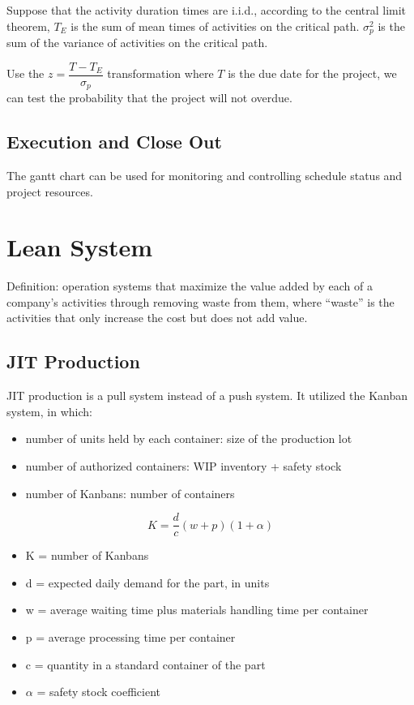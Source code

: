 \documentclass{article}
\begin{document}
Suppose that the activity duration times are i.i.d.,
according to the central limit theorem,
$T_E$ is the sum of mean times of activities on the critical path.
$\sigma_p^2$ is the sum of the variance of activities on the critical path.

Use the $z = \dfrac{T- T_E}{\sigma_p}$ transformation where $T$ is the due date for the project,
we can test the probability that the project will not overdue.

\subsection{Execution and Close Out}

The gantt chart can be used for monitoring and controlling schedule status and project resources.

\section{Lean System}

Definition: operation systems that maximize the value added by each of a company's activities through removing waste from them,
where ``waste'' is the activities that only increase the cost but does not add value.

\subsection{JIT Production}

JIT production is a pull system instead of a push system.
It utilized the Kanban system, in which:
\begin{itemize}
	\item number of units held by each container: size of the production lot
	\item number of authorized containers: WIP inventory + safety stock
	\item number of Kanbans: number of containers
\end{itemize}

\[
	K = \dfrac{d}{c}(w+p)(1+\alpha)
\]

\begin{itemize}
	\item K = number of Kanbans
	\item d = expected daily demand for the part, in units
	\item w = average waiting time plus materials handling time per container
	\item p = average processing time per container
	\item c = quantity in a standard container of the part
	\item $\alpha$ = safety stock coefficient
\end{itemize}
\end{document}
